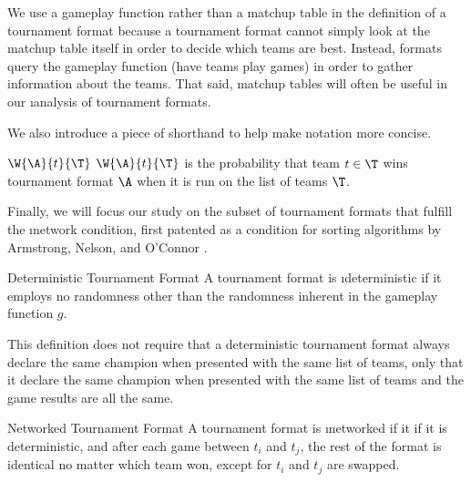 {    We use a gameplay function rather than a matchup table in the definition of a tournament format because a tournament format cannot simply look at the matchup table itself in order to decide which teams are best. Instead, formats query the gameplay function (have teams play games) in order to gather information about the teams. That said, matchup tables will often be useful in our \i{analysis} of tournament formats. 

    We also introduce a piece of shorthand to help make notation more concise.

    \begin{definition}{$\W{\A}{t}{\T}$}{}
        $\W{\A}{t}{\T}$ is the probability that team $t \in \T$ wins tournament format $\A$ when it is run on the list of teams $\T$.
    \end{definition}

    Finally, we will focus our study on the subset of tournament formats that fulfill the \i{network condition}, first patented as a condition for sorting algorithms by Armstrong, Nelson, and O'Connor \cite{pat}.

    \begin{definition}{Deterministic Tournament Format}{}
        A tournament format is \i{deterministic} if it employs no randomness other than the randomness inherent in the gameplay function $g$.
    \end{definition}

    This definition does not require that a deterministic tournament format always declare the same champion when presented with the same list of teams, only that it declare the same champion when presented with the same list of teams and the game results are all the same.

    \begin{definition}{Networked Tournament Format}{}{}
        A tournament format is \i{networked} if it  if it is deterministic, and after each game between $t_i$ and $t_j$, the rest of the format is identical no matter which team won, except for $t_i$ and $t_j$ are swapped.
    \end{definition}
}